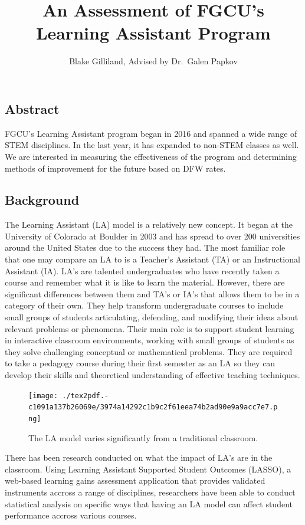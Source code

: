 \documentclass[]{article}
\title{An Assessment of FGCU's Learning Assistant Program}
\author{Blake Gilliland, Advised by Dr.~Galen Papkov}
\date{}
\begin{document}
\maketitle

\hypertarget{abstract}{%
\subsection{Abstract}\label{abstract}}

FGCU's Learning Assistant program began in 2016 and spanned a wide range
of STEM disciplines. In the last year, it has expanded to non-STEM
classes as well. We are interested in measuring the effectiveness of the
program and determining methods of improvement for the future based on
DFW rates.

\hypertarget{background}{%
\subsection{Background}\label{background}}

The Learning Assistant (LA) model is a relatively new concept. It began
at the University of Colorado at Boulder in 2003 and has spread to over
200 universities around the United States due to the success they had.
The most familiar role that one may compare an LA to is a Teacher's
Assistant (TA) or an Instructional Assistant (IA). LA's are talented
undergraduates who have recently taken a course and remember what it is
like to learn the material. However, there are significant differences
between them and TA's or IA's that allows them to be in a category of
their own. They help transform undergraduate courses to include small
groups of students articulating, defending, and modifying their ideas
about relevant problems or phenomena. Their main role is to support
student learning in interactive classroom environments, working with
small groups of students as they solve challenging conceptual or
mathematical problems. They are required to take a pedagogy course
during their first semester as an LA so they can develop their skills
and theoretical understanding of effective teaching techniques.
\cite{UC_LA} \cite{cochran}

\begin{figure}
\centering
\texttt{[image: ./tex2pdf.-c1091a137b26069e/3974a14292c1b9c2f61eea74b2ad90e9a9acc7e7.png]}
\caption{The LA model varies significantly from a traditional
classroom.}
\end{figure}

There has been research conducted on what the impact of LA's are in the
classroom. Using Learning Assistant Supported Student Outcomes (LASSO),
a web-based learning gains assessment application that provides
validated instruments accross a range of disciplines, researchers have
been able to conduct statistical analysis on specific ways that having
an LA model can affect student performance accross various courses.
\end{document}

